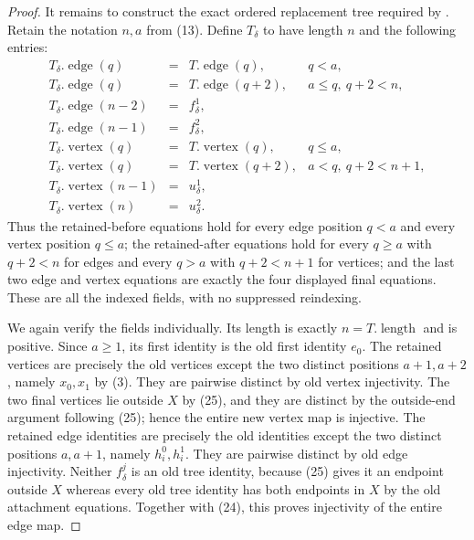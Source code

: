 \begin{proof}
It remains to construct the exact ordered replacement tree required by
.  Retain the notation $n,a$ from
(13).  Define $T_\delta$ to have length $n$ and the following entries:
\[
\begin{array}{rcll}
 T_\delta.\operatorname{edge}(q)&=&T.\operatorname{edge}(q),
   &q<a,\\
 T_\delta.\operatorname{edge}(q)&=&T.\operatorname{edge}(q+2),
   &a\le q,\ q+2<n,\\
 T_\delta.\operatorname{edge}(n-2)&=&f^1_\delta,&\\
 T_\delta.\operatorname{edge}(n-1)&=&f^2_\delta,&\\[1mm]
 T_\delta.\operatorname{vertex}(q)&=&T.\operatorname{vertex}(q),
   &q\le a,\\
 T_\delta.\operatorname{vertex}(q)&=&T.\operatorname{vertex}(q+2),
   &a<q,\ q+2<n+1,\\
 T_\delta.\operatorname{vertex}(n-1)&=&u^1_\delta,&\\
 T_\delta.\operatorname{vertex}(n)&=&u^2_\delta.&
\end{array}                                                   \tag{27}
\]
Thus the retained-before equations hold for every edge position $q<a$
and every vertex position $q\le a$; the retained-after equations hold
for every $q\ge a$ with $q+2<n$ for edges and every $q>a$ with
$q+2<n+1$ for vertices; and the last two edge and vertex equations are
exactly the four displayed final equations.  These are all the indexed
fields, with no suppressed reindexing.

We again verify the  fields individually.
Its length is exactly $n=T.\operatorname{length}$ and is positive.
Since $a\ge1$, its first identity is the old first identity $e_0$.
The retained vertices are precisely the old vertices except the two
distinct positions $a+1,a+2$, namely $x_0,x_1$ by (3).  They are
pairwise distinct by old vertex injectivity.  The two final vertices lie
outside $X$ by (25), and they are distinct by the outside-end argument
following (25); hence the entire new vertex map is injective.  The
retained edge identities are precisely the old identities except the two
distinct positions $a,a+1$, namely $h^0_i,h^1_i$.  They are pairwise
distinct by old edge injectivity.  Neither $f^j_\delta$ is an old tree
identity, because (25) gives it an endpoint outside $X$ whereas every old
tree identity has both endpoints in $X$ by the old attachment equations.
Together with (24), this proves injectivity of the entire edge map.


\end{proof}
